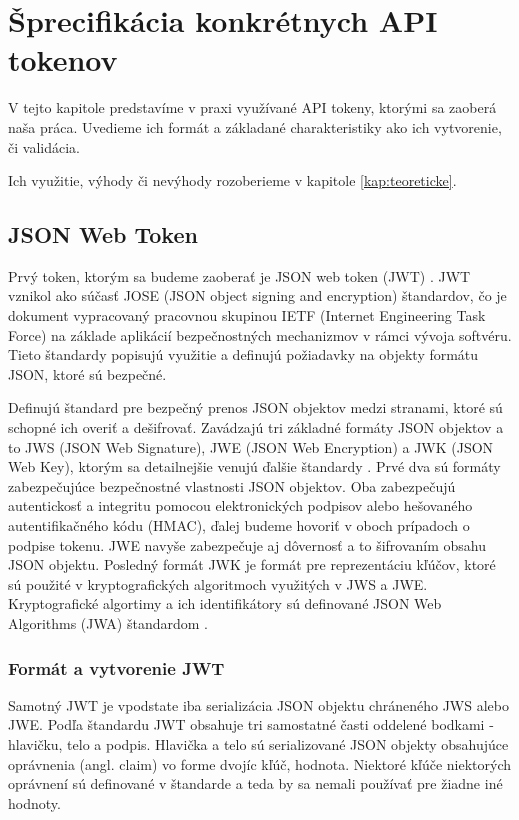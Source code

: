 \chapter{Šprecifikácia konkrétnych API tokenov}

\label{kap:typy} %

V tejto kapitole predstavíme v praxi využívané API tokeny, ktorými sa zaoberá naša práca. Uvedieme ich formát a základané charakteristiky ako ich vytvorenie, či validácia.

Ich využitie, výhody či nevýhody rozoberieme v kapitole \ref{kap:teoreticke}.

\section{JSON Web Token}

Prvý token, ktorým sa budeme zaoberať je JSON web token (JWT) \cite{jwt_rfc}. JWT vznikol ako súčasť JOSE \cite{jose_rfc} (JSON object signing and encryption) štandardov, čo je dokument vypracovaný pracovnou skupinou IETF (Internet Engineering Task Force) na základe aplikácií bezpečnostných mechanizmov v rámci vývoja softvéru. Tieto štandardy popisujú využitie a definujú požiadavky na objekty formátu JSON, ktoré sú bezpečné.

Definujú štandard pre bezpečný prenos JSON objektov medzi stranami, ktoré sú schopné ich overiť a dešifrovať. Zavádzajú tri základné formáty JSON objektov a to JWS (JSON Web Signature), JWE (JSON Web Encryption) a JWK (JSON Web Key), ktorým sa detailnejšie venujú ďalšie štandardy \cite{jws_rfc, jwe_rfc, jwk_rfc}. Prvé dva sú formáty zabezpečujúce bezpečnostné vlastnosti JSON objektov. Oba zabezpečujú autentickosť a integritu pomocou elektronických podpisov alebo hešovaného autentifikačného kódu (HMAC), ďalej budeme hovoriť v oboch prípadoch o podpise tokenu. JWE navyše zabezpečuje aj dôvernosť a to šifrovaním obsahu JSON objektu. Posledný formát JWK je formát pre reprezentáciu kľúčov, ktoré sú použité v kryptografických algoritmoch využitých v JWS a JWE. Kryptografické algortimy a ich identifikátory sú definované JSON
Web Algorithms (JWA) štandardom \cite{jwa_rfc}.

\subsection{Formát a vytvorenie JWT}

Samotný JWT je vpodstate iba serializácia JSON objektu chráneného JWS alebo JWE. Podľa štandardu JWT obsahuje tri samostatné časti oddelené bodkami - hlavičku, telo a podpis. Hlavička a telo sú serializované JSON objekty obsahujúce oprávnenia (angl. claim) vo forme dvojíc kľúč, hodnota. Niektoré kľúče niektorých oprávnení sú definované v štandarde a teda by sa nemali používať pre žiadne iné hodnoty. 

